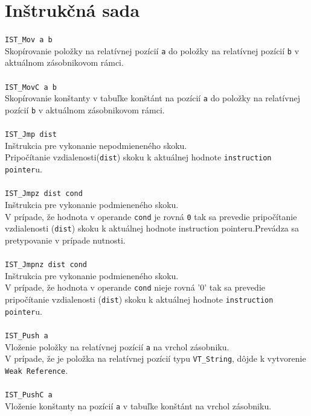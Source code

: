 \documentclass[12pt,a4paper,titlepage,final]{article}
\begin{document}
\section{Inštrukčná sada}

\texttt{IST\_Mov a b}\\
Skopírovanie položky na relatívnej pozícií \texttt{a} do položky na relatívnej pozícií \texttt{b} v aktuálnom zásobnikovom rámci. \\
\\\texttt{IST\_MovC a b} \\
Skopírovanie konštanty v tabuľke konštánt na pozícií \texttt{a} do položky na relatívnej pozícií \texttt{b} v aktuálnom zásobnikovom rámci. \\
\\\texttt{IST\_Jmp dist}\\
Inštrukcia pre vykonanie nepodmieneného skoku.\\
Pripočítanie vzdialenosti(\texttt{dist}) skoku k aktuálnej hodnote \texttt{instruction pointer}u.\\
\\\texttt{IST\_Jmpz dist cond}\\
Inštrukcia pre vykonanie podmieneného skoku.\\
V prípade, že hodnota v operande \texttt{cond} je rovná \texttt{0} tak sa prevedie
pripočítanie vzdialenosti (\texttt{dist}) skoku k aktuálnej hodnote instruction
pointeru.Prevádza sa pretypovanie v prípade nutnosti.\\
\\\texttt{IST\_Jmpnz dist cond}\\
Inštrukcia pre vykonanie podmieneného skoku.\\
V prípade, že hodnota v operande \texttt{cond} nieje rovná '0' tak sa prevedie
pripočítanie vzdialenosti (\texttt{dist}) skoku k aktuálnej hodnote \texttt{instruction pointer}u. \\
\\\texttt{IST\_Push a}\\
Vloženie položky na relatívnej pozícií \texttt{a} na vrchol zásobniku.\\
V prípade, že je položka na relatívnej pozícií typu \texttt{VT\_String}, dôjde k vytvorenie \texttt{Weak Reference}.\\
\\\texttt{IST\_PushC a}\\
Vloženie konštanty na pozícií \texttt{a} v tabuľke konštánt na vrchol zásobniku.\\
\end{document}
